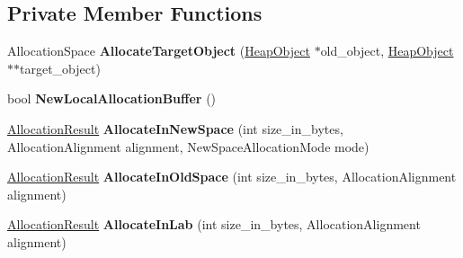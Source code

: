 \subsection*{Private Member Functions}
\begin{DoxyCompactItemize}
\item 
Allocation\+Space {\bfseries Allocate\+Target\+Object} (\hyperlink{classv8_1_1internal_1_1_heap_object}{Heap\+Object} $\ast$old\+\_\+object, \hyperlink{classv8_1_1internal_1_1_heap_object}{Heap\+Object} $\ast$$\ast$target\+\_\+object)\hypertarget{classv8_1_1internal_1_1_mark_compact_collector_1_1_evacuate_new_space_visitor_aa477763430d448086c383085ade977f1}{}\label{classv8_1_1internal_1_1_mark_compact_collector_1_1_evacuate_new_space_visitor_aa477763430d448086c383085ade977f1}

\item 
bool {\bfseries New\+Local\+Allocation\+Buffer} ()\hypertarget{classv8_1_1internal_1_1_mark_compact_collector_1_1_evacuate_new_space_visitor_afcac83cd9ebfcda00353c6cd8a388185}{}\label{classv8_1_1internal_1_1_mark_compact_collector_1_1_evacuate_new_space_visitor_afcac83cd9ebfcda00353c6cd8a388185}

\item 
\hyperlink{classv8_1_1internal_1_1_allocation_result}{Allocation\+Result} {\bfseries Allocate\+In\+New\+Space} (int size\+\_\+in\+\_\+bytes, Allocation\+Alignment alignment, New\+Space\+Allocation\+Mode mode)\hypertarget{classv8_1_1internal_1_1_mark_compact_collector_1_1_evacuate_new_space_visitor_a94bb535a5102faa62c142f22b2ed0417}{}\label{classv8_1_1internal_1_1_mark_compact_collector_1_1_evacuate_new_space_visitor_a94bb535a5102faa62c142f22b2ed0417}

\item 
\hyperlink{classv8_1_1internal_1_1_allocation_result}{Allocation\+Result} {\bfseries Allocate\+In\+Old\+Space} (int size\+\_\+in\+\_\+bytes, Allocation\+Alignment alignment)\hypertarget{classv8_1_1internal_1_1_mark_compact_collector_1_1_evacuate_new_space_visitor_a25004571cce32f29d657e54286df7a3b}{}\label{classv8_1_1internal_1_1_mark_compact_collector_1_1_evacuate_new_space_visitor_a25004571cce32f29d657e54286df7a3b}

\item 
\hyperlink{classv8_1_1internal_1_1_allocation_result}{Allocation\+Result} {\bfseries Allocate\+In\+Lab} (int size\+\_\+in\+\_\+bytes, Allocation\+Alignment alignment)\hypertarget{classv8_1_1internal_1_1_mark_compact_collector_1_1_evacuate_new_space_visitor_aa4ea2efac22d1a468fa741f620f4f67b}{}\label{classv8_1_1internal_1_1_mark_compact_collector_1_1_evacuate_new_space_visitor_aa4ea2efac22d1a468fa741f620f4f67b}

\end{DoxyCompactItemize}
